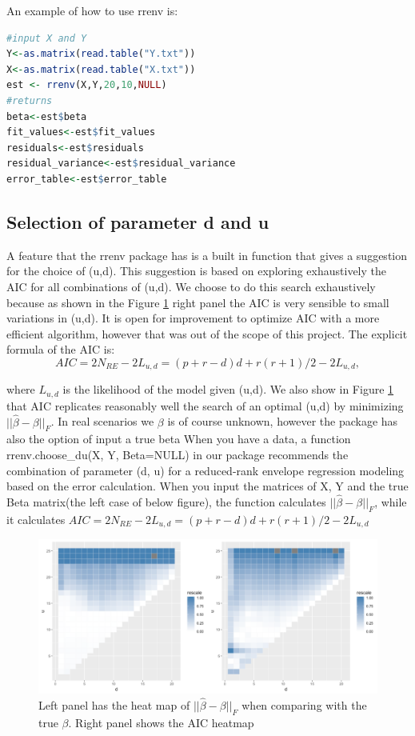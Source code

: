 \documentclass[11pt,a4paper]{article}
\begin{document}
An example of how to use rrenv is:
\begin{lstlisting}[language=R]
#input X and Y
Y<-as.matrix(read.table("Y.txt"))
X<-as.matrix(read.table("X.txt"))
est <- rrenv(X,Y,20,10,NULL)
#returns
beta<-est$beta
fit_values<-est$fit_values
residuals<-est$residuals
residual_variance<-est$residual_variance
error_table<-est$error_table
\end{lstlisting}

\subsection{Selection of parameter d and u}
A feature that the rrenv package has is a built in function that gives a suggestion for the choice of (u,d). 
This suggestion is based on exploring exhaustively the AIC for all combinations of (u,d). 
We choose to do this search exhaustively because as shown in the Figure \ref{fig:choose_du} right panel the AIC is very sensible to small variations in (u,d). 
It is open for improvement to optimize AIC with a more efficient algorithm, however that was out of the scope of this project.
The explicit formula of the AIC is:
\begin{equation}\label{eq:AIC}
AIC=2N_{RE}-2L_{u,d}=(p+r-d)d+r(r+1)/2-2L_{u,d},
\end{equation}

where $L_{u,d}$ is the likelihood of the model given (u,d). 
We also show in Figure \ref{fig:choose_du} that AIC replicates reasonably well the search of an optimal (u,d) by minimizing $||\hat{\beta}-\beta||_F$. 
In real scenarios we $\beta$ is of course unknown, however the package has also the option of input a true beta 
When you have a data, a function rrenv.choose\_du(X, Y, Beta=NULL) in our package recommends the combination of parameter (d, u) for a reduced-rank envelope regression modeling based on the error calculation. When you input the matrices of X, Y and the true Beta matrix(the left case of below figure), the function calculates $||\hat{\beta}-\beta||_F$,  while it calculates $AIC=2N_{RE}-2L_{u,d}=(p+r-d)d+r(r+1)/2-2L_{u,d}$
\begin{figure}
\centering
\label{fig:choose_du}
\includegraphics[scale=.6]{choose_du.png}
\caption{Left panel has the heat map of $||\hat{\beta}-\beta||_F$ when comparing with the true $\beta$. Right panel shows the AIC heatmap}
\end{figure}
\end{document}
